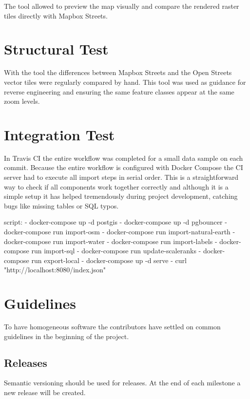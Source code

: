 The  tool allowed to preview the map visually and compare the rendered raster tiles directly with Mapbox Streets.

\section{Structural Test}

With the  tool the differences between Mapbox Streets and the Open Streets vector tiles were regularly compared by hand. This tool was used as guidance for reverse engineering and ensuring the same feature classes appear at the same zoom levels.

\section{Integration Test}

In Travis CI\cite{pm_5_travis-ci.org_2015}  the entire workflow was completed for a small data sample on each commit.
Because the entire workflow is configured with Docker Compose \cite{pm_6_docs.docker.com_2015} the CI server had to execute all import steps in serial order. This is a straightforward way to check if all components work together correctly
and although it is a simple setup it has helped tremendously during project development, catching bugs
like missing tables or SQL typos.

\begin{yamlcode}
script:
  - docker-compose up -d postgis
  - docker-compose up -d pgbouncer
  - docker-compose run import-osm
  - docker-compose run import-natural-earth
  - docker-compose run import-water
  - docker-compose run import-labels
  - docker-compose run import-sql
  - docker-compose run update-scaleranks
  - docker-compose run export-local
  - docker-compose up -d serve
  - curl "http://localhost:8080/index.json"
\end{yamlcode}



\section{Guidelines}\label{guidelines}
To have homogeneous software the contributors have settled on common guidelines in the beginning of the project.

\subsection{Releases}
Semantic versioning \cite{pm_7_preston-werner_2015} should be used for releases.
At the end of each milestone a new release will be created.
\newpage

